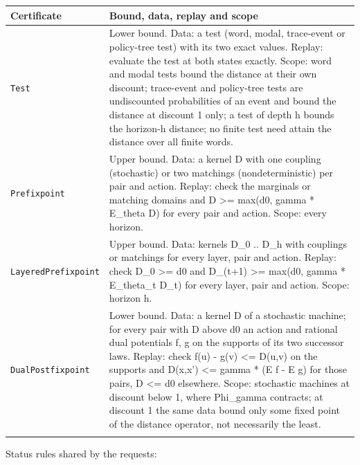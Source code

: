 \documentclass[11pt]{article}
\newcommand{\code}[1]{\texttt{#1}}
\theoremstyle{definition}
\theoremstyle{plain}
\begin{document}
{\footnotesize\begin{longtable}{>{\raggedright\arraybackslash}p{3.0cm}>{\raggedright\arraybackslash}p{11.4cm}}
\toprule Certificate & Bound, data, replay and scope\\ \midrule \endhead
\code{Test} & Lower bound. Data: a test (word,\allowbreak{} modal,\allowbreak{} trace-event or policy-tree test) with its two exact values. Replay: evaluate the test at both states exactly. Scope: word and modal tests bound the distance at their own discount; trace-event and policy-tree tests are undiscounted probabilities of an event and bound the distance at discount 1 only; a test of depth h bounds the horizon-h distance; no finite test need attain the distance over all finite words.\\ \addlinespace[3pt]
\code{Prefixpoint} & Upper bound. Data: a kernel D with one coupling (stochastic) or two matchings (nondeterministic) per pair and action. Replay: check the marginals or matching domains and D >= max(d0,\allowbreak{} gamma * E\_theta D) for every pair and action. Scope: every horizon.\\ \addlinespace[3pt]
\code{LayeredPrefixpoint} & Upper bound. Data: kernels D\_0 .. D\_h with couplings or matchings for every layer,\allowbreak{} pair and action. Replay: check D\_0 >= d0 and D\_(t+1) >= max(d0,\allowbreak{} gamma * E\_theta\_t D\_t) for every layer,\allowbreak{} pair and action. Scope: horizon h.\\ \addlinespace[3pt]
\code{DualPostfixpoint} & Lower bound. Data: a kernel D of a stochastic machine; for every pair with D above d0 an action and rational dual potentials f,\allowbreak{} g on the supports of its two successor laws. Replay: check f(u) - g(v) <= D(u,\allowbreak{}v) on the supports and D(x,\allowbreak{}x') <= gamma * (E f - E g) for those pairs,\allowbreak{} D <= d0 elsewhere. Scope: stochastic machines at discount below 1,\allowbreak{} where Phi\_gamma contracts; at discount 1 the same data bound only some fixed point of the distance operator,\allowbreak{} not necessarily the least.\\ \addlinespace[3pt]
\bottomrule\end{longtable}}
Status rules shared by the requests:
\end{document}
